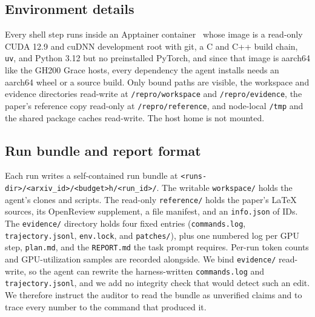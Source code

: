 
\subsection{Environment details}
\label{app:sandbox}

Every shell step runs inside an Apptainer
container~\citep{kurtzer2017singularity} whose image is a read-only CUDA 12.9
and cuDNN development root with git, a C and C++ build chain, \texttt{uv}, and
Python 3.12 but no preinstalled PyTorch, and since that image is aarch64 like the
GH200 Grace hosts, every dependency the agent installs needs an aarch64 wheel or
a source build. Only bound paths are visible, the
workspace and evidence directories read-write at \texttt{/repro/workspace} and
\texttt{/repro/evidence}, the paper's reference copy read-only at
\texttt{/repro/reference}, and node-local \texttt{/tmp} and the shared package
caches read-write. The host home is not mounted.

\subsection{Run bundle and report format}
\label{app:report-format}

Each run writes a self-contained run bundle at
\texttt{<runs-dir>/\allowbreak<arxiv\_id>/\allowbreak<budget>h/\allowbreak<run\_id>/}.
The writable \texttt{workspace/} holds the agent's clones and scripts. The
read-only \texttt{reference/} holds the paper's LaTeX sources, its OpenReview
supplement, a file manifest, and an \texttt{info.json} of IDs. The
\texttt{evidence/} directory holds four fixed entries (\texttt{commands.log},
\texttt{trajectory.jsonl}, \texttt{env.lock}, and \texttt{patches/}), plus
one numbered log per GPU step, \texttt{plan.md}, and the \texttt{REPORT.md}
the task prompt requires. Per-run token counts and GPU-utilization samples are
recorded alongside. We bind \texttt{evidence/} read-write, so the agent
can rewrite the harness-written \texttt{commands.log} and
\texttt{trajectory.jsonl}, and we add no integrity check that would detect such
an edit. We therefore instruct the auditor to read the bundle as unverified
claims and to trace every number to the command that produced it.

